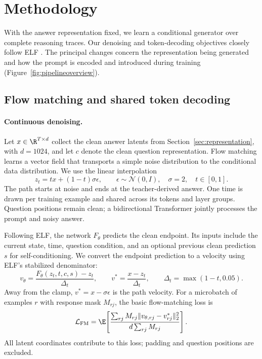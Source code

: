 \section{Methodology}
\label{sec:methodology}

With the answer representation fixed, we learn a conditional generator over complete reasoning traces. Our denoising and token-decoding objectives closely follow ELF \citep{elf}. The principal changes concern the representation being generated and how the prompt is encoded and introduced during training (Figure~\ref{fig:pipelineoverview}).

\subsection{Flow matching and shared token decoding}
\label{sec:methodflow}

\paragraph{Continuous denoising.}
Let $x\in\R^{T\times d}$ collect the clean answer latents from Section~\ref{sec:representation}, with $d=1024$, and let $c$ denote the clean question representation. Flow matching \citep{flowmatching} learns a vector field that transports a simple noise distribution to the conditional data distribution. We use the linear interpolation
\begin{equation}
 z_t=t x+(1-t)\sigma\epsilon,
 \qquad \epsilon\sim\mathcal N(0,I),\quad \sigma=2,\quad t\in[0,1].
 \label{eq:methodinterpolant}
\end{equation}
The path starts at noise and ends at the teacher-derived answer. One time is drawn per training example and shared across its tokens and layer groups. Question positions remain clean; a bidirectional Transformer jointly processes the prompt and noisy answer.

Following ELF, the network $F_\theta$ predicts the clean endpoint. Its inputs include the current state, time, question condition, and an optional previous clean prediction $s$ for self-conditioning. We convert the endpoint prediction to a velocity using ELF's stabilized denominator:
\begin{equation}
 v_\theta=\frac{F_\theta(z_t,t,c,s)-z_t}{\Delta_t},
 \qquad v^*=\frac{x-z_t}{\Delta_t},
 \qquad \Delta_t=\max(1-t,0.05).
 \label{eq:methodvelocity}
\end{equation}
Away from the clamp, $v^*=x-\sigma\epsilon$ is the path velocity. For a microbatch of examples $r$ with response mask $M_{rj}$, the basic flow-matching loss is
\begin{equation}
 \mathcal L_{\mathrm{FM}}=
 \E\!\left[\frac{\sum_{rj} M_{rj}\|v_{\theta,rj}-v_{rj}^*\|_2^2}
 {d\sum_{rj} M_{rj}}\right].
 \label{eq:methodflowloss}
\end{equation}
All latent coordinates contribute to this loss; padding and question positions are excluded.

